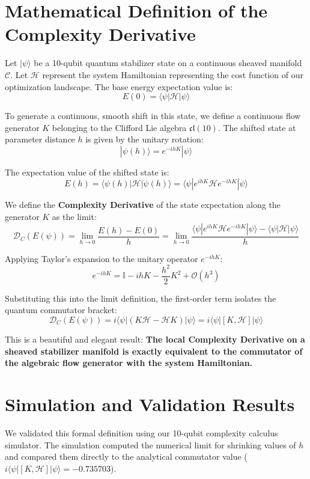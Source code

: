 \documentclass[11pt,twocolumn]{article}
\begin{document}
\section{Mathematical Definition of the Complexity Derivative}
Let $|\psi\rangle$ be a 10-qubit quantum stabilizer state on a continuous sheaved manifold $\mathcal{C}$. Let $\mathcal{H}$ represent the system Hamiltonian representing the cost function of our optimization landscape. The base energy expectation value is:
$$E(0) = \langle\psi| \mathcal{H} |\psi\rangle$$

To generate a continuous, smooth shift in this state, we define a continuous flow generator $K$ belonging to the Clifford Lie algebra $\mathfrak{cl}(10)$. The shifted state at parameter distance $h$ is given by the unitary rotation:
$$| \psi(h) \rangle = e^{-i h K} | \psi \rangle$$

The expectation value of the shifted state is:
$$E(h) = \langle\psi(h)| \mathcal{H} |\psi(h)\rangle = \langle\psi| e^{i h K} \mathcal{H} e^{-i h K} |\psi\rangle$$

We define the \textbf{Complexity Derivative} of the state expectation along the generator $K$ as the limit:
$$\mathcal{D}_C \left(E(\psi)\right) = \lim_{h \to 0} \frac{E(h) - E(0)}{h} = \lim_{h \to 0} \frac{\langle\psi| e^{i h K} \mathcal{H} e^{-i h K} |\psi\rangle - \langle\psi| \mathcal{H} |\psi\rangle}{h}$$

Applying Taylor's expansion to the unitary operator $e^{-i h K}$:
$$e^{-i h K} = \mathbb{I} - i h K - \frac{h^2}{2} K^2 + \mathcal{O}(h^3)$$

Substituting this into the limit definition, the first-order term isolates the quantum commutator bracket:
$$\mathcal{D}_C \left(E(\psi)\right) = i \langle\psi| \left( K \mathcal{H} - \mathcal{H} K \right) |\psi\rangle = i \langle\psi| \left[ K, \mathcal{H} \right] |\psi\rangle$$

This is a beautiful and elegant result: \textbf{The local Complexity Derivative on a sheaved stabilizer manifold is exactly equivalent to the commutator of the algebraic flow generator with the system Hamiltonian.}

\section{Simulation and Validation Results}
We validated this formal definition using our 10-qubit complexity calculus simulator. The simulation computed the numerical limit for shrinking values of $h$ and compared them directly to the analytical commutator value ($i \langle\psi| [K, \mathcal{H}] |\psi\rangle = -0.735703$).
\end{document}
